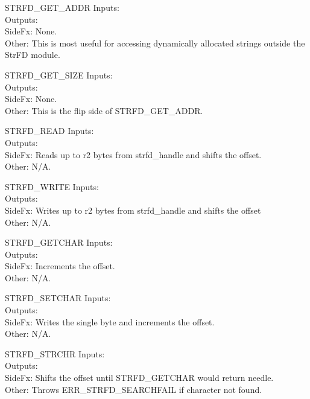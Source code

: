 \begin{sccall}{STRFD\_GET\_ADDR}
Inputs: \\
Outputs: \\
SideFx: None.\\
Other: This is most useful for accessing dynamically allocated strings outside
the StrFD module.
\end{sccall}
\begin{sccall}{STRFD\_GET\_SIZE}
Inputs: \\
Outputs: \\
SideFx: None.\\
Other: This is the flip side of STRFD\_GET\_ADDR.
\end{sccall}
\begin{sccall}{STRFD\_READ}
Inputs: \\
Outputs: \\
SideFx: Reads up to r2 bytes from strfd\_handle and shifts the offset.\\
Other: N/A.
\end{sccall}
\begin{sccall}{STRFD\_WRITE}
Inputs: \\
Outputs: \\
SideFx: Writes up to r2 bytes from strfd\_handle and shifts the offset\\
Other: N/A.
\end{sccall}
\begin{sccall}{STRFD\_GETCHAR}
Inputs: \\
Outputs: \\
SideFx: Increments the offset.\\
Other: N/A.
\end{sccall}
\begin{sccall}{STRFD\_SETCHAR}
Inputs: \\
Outputs: \scargs{}\\
SideFx: Writes the single byte and increments the offset.\\
Other: N/A.
\end{sccall}
\begin{sccall}{STRFD\_STRCHR}
Inputs: \\
Outputs: \scargs{}\\
SideFx: Shifts the offset until STRFD\_GETCHAR would return needle.\\
Other: Throws ERR\_STRFD\_SEARCHFAIL if character not found.
\end{sccall}
